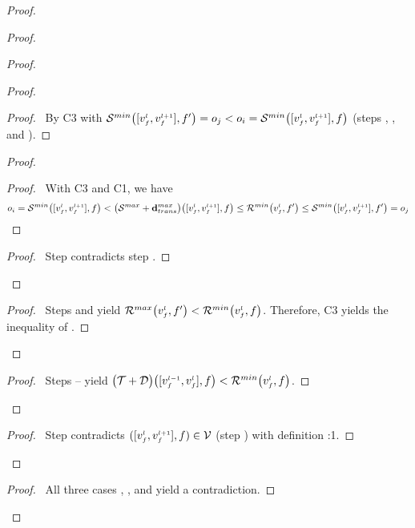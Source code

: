 \begin{proof}
\begin{proof}
\begin{proof}
            \begin{proof}
        	\begin{proof}
		  \pf\ By C3 with $\Smin{\clink{l}{f}, f'} = o_j < o_i = \Smin{\clink{l}{f},f}$ (steps , , and ).
        	\end{proof}
        	\begin{proof}
        	    \begin{proof}
        		\pf\ With C3 and C1, we have
        		\begin{equation*}
			  o_i = \Smin{\clink{l}{f},f} < \add{\Smax}{\dpdbtransmax}{\clink{l}{f},f} \leq \Rmin{\v{l}{f},f'} \leq \Smin{\clink{l}{f},f'} = o_j
        		\end{equation*}
        	    \end{proof}
        	    \qedstep
        	    \begin{proof}
        		\pf\ Step  contradicts step .
        	    \end{proof}
        	\end{proof}
		\qedstep
		\begin{proof}
		  \pf\ Steps  and  yield $\Rmax{\v{l}{f},f'} < \Rmin{\v{l}{f},f}$.
		    Therefore, C3 yields the inequality of .
		\end{proof}
            \end{proof}
            \qedstep
            \begin{proof}
	      \pf\ Steps -- yield $\add{\T}{\D}{\pclink{l}{f},f} < \Rmin{\v{l}{f},f}$.
            \end{proof}
        \end{proof}
        \qedstep
        \begin{proof}
	  \pf\ Step  contradicts $([v_{\scriptscriptstyle f}^{\scriptscriptstyle l}, v_{\scriptscriptstyle f}^{\scriptscriptstyle l+1}],f) \in \mathcal{V}$ (step ) with definition \toplevel:1.
        \end{proof}
    \end{proof}
    \qedstep
    \begin{proof}
	\pf\ All three cases , , and  yield a contradiction.
    \end{proof}
\end{proof}

